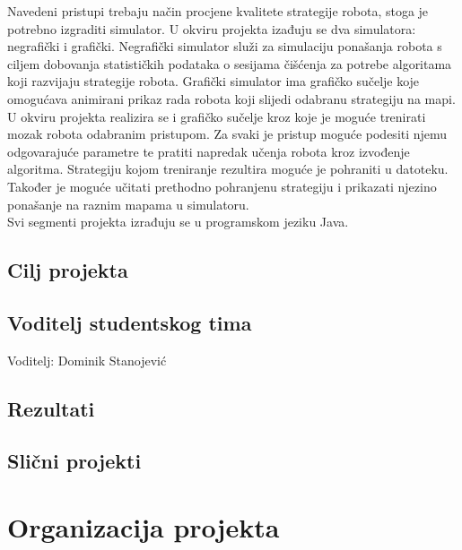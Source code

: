 \documentclass[times, utf8, numeric]{fer}
\begin{document}
\vspace{1ex}
Navedeni pristupi trebaju način procjene kvalitete strategije robota, stoga je potrebno izgraditi simulator. U okviru projekta izađuju se dva simulatora: negrafički i grafički. Negrafički simulator služi za simulaciju ponašanja robota s ciljem dobovanja statističkih podataka o sesijama čišćenja za potrebe algoritama koji razvijaju strategije robota. Grafički simulator ima grafičko sučelje koje omogućava animirani prikaz rada robota koji slijedi odabranu strategiju na mapi.
\vspace{1ex}\\
U okviru projekta realizira se i grafičko sučelje kroz koje je moguće trenirati mozak robota odabranim pristupom. Za svaki je pristup moguće podesiti njemu odgovarajuće parametre te pratiti napredak učenja robota kroz izvođenje algoritma. Strategiju kojom treniranje rezultira moguće je pohraniti u datoteku. Također je moguće učitati prethodno pohranjenu strategiju i prikazati njezino ponašanje na raznim mapama u simulatoru.
\\
Svi segmenti projekta izrađuju se u programskom jeziku Java.

\section{Cilj projekta}

\section{Voditelj studentskog tima}
Voditelj: Dominik Stanojević

\section{Rezultati}
\section{Slični projekti}

\chapter{Organizacija projekta}
\end{document}
